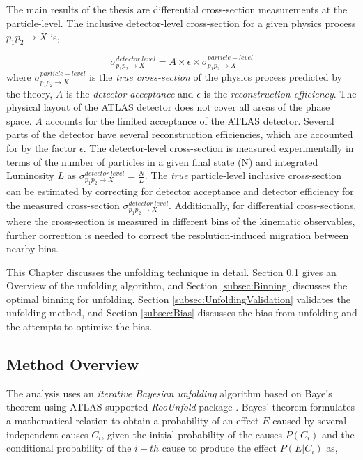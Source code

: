 The main results of the thesis are differential cross-section measurements at the particle-level. The inclusive detector-level cross-section for a given physics process $p_{1}p_{2}\rightarrow X$ is, 

\begin{equation}
    \sigma ^{detector~level}_{p_{1}p_{2}\rightarrow X} = A \times \epsilon \times \sigma ^{particle-level}_{p_{1}p_{2}\rightarrow X}
    \label{eqn:InclusiveXS}
\end{equation}
where $\sigma ^{particle-level}_{p_{1}p_{2}\rightarrow X}$ is the \textit{true cross-section} of the physics process predicted by the theory, $A$ is the \textit{detector acceptance} and $\epsilon$ is the \textit{reconstruction efficiency}. The physical layout of the ATLAS detector does not cover all areas of the phase space. $A$ accounts for the limited acceptance of the ATLAS detector. Several parts of the detector have several reconstruction efficiencies, which are accounted for by the factor $\epsilon$. The detector-level cross-section is measured experimentally in terms of the number of particles in a given final state (N) and integrated Luminosity $L$ as $\sigma ^{detector~level}_{p_{1}p_{2}\rightarrow X} = \frac{N}{L}$. The \textit{true} particle-level inclusive cross-section can be estimated by correcting for detector acceptance and detector efficiency for the measured cross-section $\sigma ^{detector~level}_{p_{1}p_{2}\rightarrow X}$. Additionally, for differential cross-sections, where the cross-section is measured in different bins of the kinematic observables, further correction is needed to correct the resolution-induced migration between nearby bins. 

This Chapter discusses the unfolding technique in detail. Section \ref{subsec:UnfoldingOverview} gives an Overview of the unfolding algorithm, and Section \ref{subsec:Binning} discusses the optimal binning for unfolding. Section \ref{subsec:UnfoldingValidation} validates the unfolding method, and Section \ref{subsec:Bias} discusses the bias from unfolding and the attempts to optimize the bias. 

\subsection{Method Overview}
\label{subsec:UnfoldingOverview}
The analysis uses an \textit{iterative Bayesian unfolding} algorithm based on Baye's theorem \cite{BayesianUnfolding} \cite{Improved_BayesianUnfolding} using ATLAS-supported \textit{RooUnfold} package \cite{RooUnfold}. Bayes' theorem formulates a mathematical relation to obtain a probability of an effect $E$ caused by several independent causes $C_{i}$, given the initial probability of the causes $P(C_{i})$ and the conditional probability of the $i-th$ cause to produce the effect $P(E|C_{i})$ as, 


